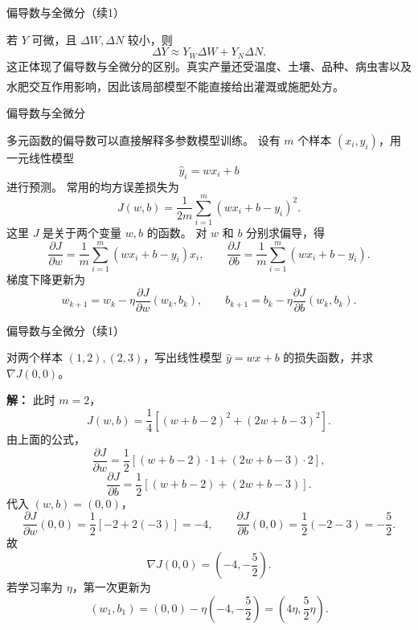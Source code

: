 \documentclass[aspectratio=169,10pt,fontset=fandol]{ctexbeamer}
\renewenvironment{solution}{\par\noindent\textbf{解：}\quad}{\par}
\newcommand{\upcite}[1]{\textsuperscript{\textsuperscript{\cite{#1}}}}
\begin{document}
\begin{frame}[t,fragile]{偏导数与全微分（续1）}
\normalsize
{\normalsize
\begin{application}[作物产量对水分和氮肥的敏感性]
若 $Y$ 可微，且 $\Delta W,\Delta N$ 较小，则
\[
\Delta Y\approx Y_W\Delta W+Y_N\Delta N.
\]
这正体现了偏导数与全微分的区别。真实产量还受温度、土壤、品种、病虫害以及水肥交互作用影响，因此该局部模型不能直接给出灌溉或施肥处方。\upcite{TaizPlant}
\end{application}
}
\end{frame}
\begin{frame}[t,fragile]{偏导数与全微分}
\footnotesize
{\footnotesize
\begin{application}[偏导数在多参数机器学习模型中的应用]
	
	多元函数的偏导数可以直接解释多参数模型训练。 设有 $m$ 个样本 $(x_i,y_i)$，用一元线性模型
	\[
	\hat y_i=wx_i+b
	\]
	进行预测。 常用的均方误差损失为
	\[
	J(w,b)=\frac{1}{2m}\sum_{i=1}^{m}(wx_i+b-y_i)^2.
	\]
	这里 $J$ 是关于两个变量 $w,b$ 的函数。 对 $w$ 和 $b$ 分别求偏导，得
	\[
	\frac{\partial J}{\partial w}
	=\frac{1}{m}\sum_{i=1}^{m}(wx_i+b-y_i)x_i,
	\qquad
	\frac{\partial J}{\partial b}
	=\frac{1}{m}\sum_{i=1}^{m}(wx_i+b-y_i).
	\]
	梯度下降更新为
	\[
	w_{k+1}=w_k-\eta\frac{\partial J}{\partial w}(w_k,b_k),\qquad
	b_{k+1}=b_k-\eta\frac{\partial J}{\partial b}(w_k,b_k).
	\]
	

\end{application}
}
\end{frame}
\begin{frame}[t,fragile]{偏导数与全微分（续1）}
\footnotesize
{\footnotesize
\begin{application}[偏导数在多参数机器学习模型中的应用]
	\begin{example}
		对两个样本 $(1,2),(2,3)$，写出线性模型 $\hat y=wx+b$ 的损失函数，并求 $\nabla J(0,0)$。
	\end{example}
	\begin{solution}
		此时 $m=2$，
		\[
		J(w,b)=\frac14\left[(w+b-2)^2+(2w+b-3)^2\right].
		\]
		由上面的公式，
		\[
		\frac{\partial J}{\partial w}
		=\frac12\left[(w+b-2)\cdot1+(2w+b-3)\cdot2\right],
		\]
		\[
		\frac{\partial J}{\partial b}
		=\frac12\left[(w+b-2)+(2w+b-3)\right].
		\]
		代入 $(w,b)=(0,0)$，
		\[
		\frac{\partial J}{\partial w}(0,0)=\frac12[-2+2(-3)]=-4,\qquad
		\frac{\partial J}{\partial b}(0,0)=\frac12(-2-3)=-\frac52.
		\]
		故
		\[
		\nabla J(0,0)=\left(-4,-\frac52\right).
		\]
		若学习率为 $\eta$，第一次更新为
		\[
		(w_1,b_1)=\left(0,0\right)-\eta\left(-4,-\frac52\right)
		=\left(4\eta,\frac52\eta\right).
		\]
	\end{solution}
	
	
	
	
\end{application}
}
\end{frame}
\end{document}
